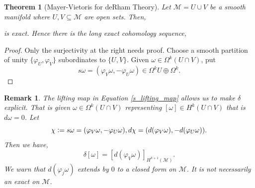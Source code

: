 \documentclass[10pt]{article}
\newtheorem{theorem}{Theorem} [section]
\newtheorem{remark}{Remark}[section]
\newcommand{\defeq}{\vcentcolon=}
\newcommand{\M}[0]{\mathcal{M}}
\begin{document}
\begin{theorem}[Mayer-Vietoris for deRham Theory]
  Let $\M=U\cup V$ be a smooth manifold where $U,V\subseteq\M$ are open sets. Then,
  \begin{center}
  \end{center}
  is exact.
  Hence there is the long exact cohomology sequence, 
  \begin{center}
  \end{center}
\end{theorem}

\begin{proof}
  Only the surjectivity at the right needs proof. Choose a smooth partition of unity $\{\varphi_U,\varphi_V\}$ subordinates to $\{U,V\}$. Given $\omega\in\Omega^k(U\cap V)$, put 
  \begin{equation*}
    s\omega = (\varphi_V\omega,-\varphi_U\omega)\in\Omega^k U\oplus \Omega^k.\tag{$\ast$}\label{s_lifting_map}
  \end{equation*}
\end{proof}

\begin{remark}
  The lifting map in Equation \eqref{s_lifting_map} allows us to make $\delta$ explicit. That is given $\omega\in\Omega^k(U\cap V)$ representing $[\omega]\in H^k(U\cap V)$ that is $d\omega = 0$. Let 
  \begin{equation*}
    \chi\defeq s\omega = (\varphi_V\omega,-\varphi_U\omega),d\chi=(d(\varphi_V\omega),-d(\varphi_U\omega)).
  \end{equation*}
  Then we have,
  \begin{equation*}
    \delta[\omega]=[d(\varphi_V\omega)]_{H^{k+1}(\M)}.
  \end{equation*}
  We warn that $d(\varphi_j\omega)$ extends by $0$ to a closed form on $\M$. It is not necessarily an exact on $\M$.
\end{remark}
\end{document}
